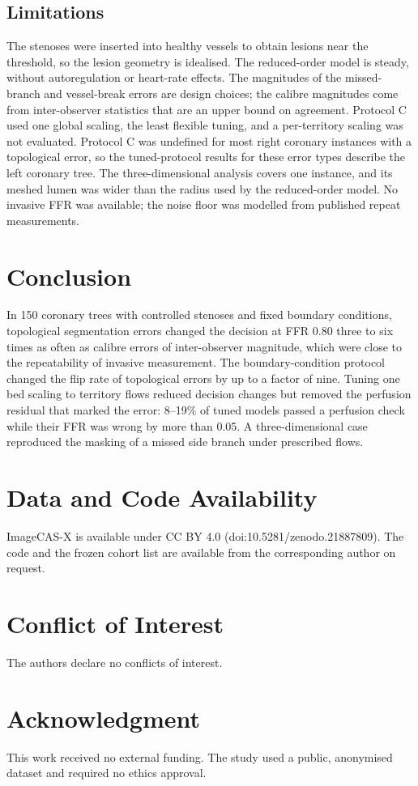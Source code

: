 \documentclass[journal]{IEEEtran}
\begin{document}
\subsection{Limitations}
The stenoses were inserted into healthy vessels to obtain lesions near the threshold, so the lesion geometry is
idealised. The reduced-order model is steady, without autoregulation or heart-rate effects. The magnitudes of the
missed-branch and vessel-break errors are design choices; the calibre magnitudes come from inter-observer statistics
that are an upper bound on agreement. Protocol C used one global scaling, the least flexible tuning, and a
per-territory scaling was not evaluated. Protocol C was undefined for most right coronary instances with a
topological error, so the tuned-protocol results for these error types describe the left coronary tree. The
three-dimensional analysis covers one instance, and its meshed lumen was wider than the radius used by the
reduced-order model. No invasive FFR was available; the noise floor was modelled from published repeat measurements.

\section{Conclusion}
In 150 coronary trees with controlled stenoses and fixed boundary conditions, topological segmentation errors
changed the decision at FFR 0.80 three to six times as often as calibre errors of inter-observer magnitude, which were close to the repeatability of
invasive measurement. The boundary-condition protocol changed the flip rate of topological errors by up to a factor of nine. Tuning one bed scaling to territory flows reduced decision changes but removed the perfusion residual that
marked the error: 8--19\% of tuned models passed a perfusion check while their FFR was wrong by more than 0.05. A
three-dimensional case reproduced the masking of a missed side branch under prescribed flows.

\section*{Data and Code Availability}
ImageCAS-X is available under CC BY 4.0 (doi:10.5281/zenodo.21887809). The code and the frozen cohort list are available from the
corresponding author on request.

\section*{Conflict of Interest}
The authors declare no conflicts of interest.

\section*{Acknowledgment}
This work received no external funding. The study used a public, anonymised dataset and required no ethics approval.



\end{document}
